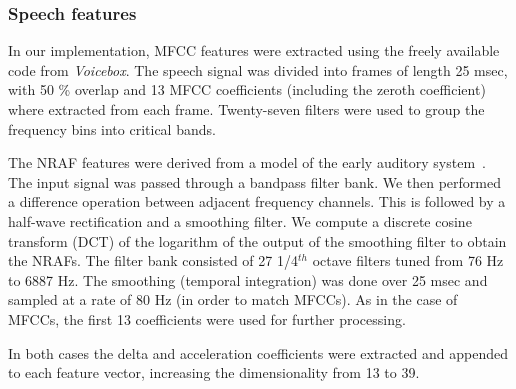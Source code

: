 \documentclass[12pt,letterpaper,doublespaced,ETD,dvips,proposal]{gtthesis}
\begin{document}
\begin{Body}
\subsubsection{Speech features} In our implementation, MFCC features
were extracted using the freely available code from \emph{Voicebox}.
The speech signal was divided into frames of length 25 msec, with 50
\% overlap and 13 MFCC coefficients (including the zeroth
coefficient) where extracted from each frame. Twenty-seven filters
were used to group the frequency bins into critical bands.

The NRAF features were derived from a model of the early auditory
system~\cite{shamma_main}. The input signal was passed through a
bandpass filter bank. We then performed a difference operation
between adjacent frequency channels. This is followed by a half-wave
rectification and a smoothing filter. We compute a discrete cosine
transform (DCT) of the logarithm of the output of the smoothing
filter to obtain the NRAFs. The filter bank consisted of 27
1/4$^{th}$ octave filters tuned from 76 Hz to 6887 Hz. The smoothing
(temporal integration) was done over 25 msec and sampled at a rate
of 80 Hz (in order to match MFCCs). As in the case of MFCCs, the
first 13 coefficients were used for further processing.

In both cases the delta and acceleration coefficients were extracted
and appended to each feature vector, increasing the dimensionality
from 13 to 39.


\end{Body}
\end{document}
